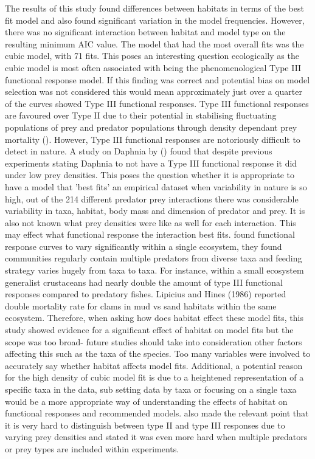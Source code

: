 \documentclass[11pt]{article}
\begin{document}
The results of this study found differences between habitats in terms of the best fit model and also found significant variation in the model frequencies. However, there was no significant interaction between habitat and model type on the resulting minimum AIC value. The model that had the most overall fits was the cubic model, with 71 fits. This poses an interesting question ecologically as the cubic model is most often associated with being the phenomenological Type III functional response model. If this finding was correct and potential bias on model selection was not considered this would mean approximately just over a quarter of the curves showed Type III functional responses. Type III functional responses are favoured over Type II due to their potential in stabilising fluctuating populations of prey and predator populations through density dependant prey mortality (\cite{Sarnelle2008}). However, Type III functional responses are notoriously difficult to detect in nature. A study on Daphnia by (\cite{Sarnelle2008}) found that despite previous experiments stating Daphnia to not have a Type III functional response it did under low prey densities. This poses the question whether it is appropriate to have a model that 'best fits' an empirical dataset when variability in nature is so high, out of the 214 different predator prey interactions there was considerable variability in taxa, habitat, body mass and dimension of predator and prey. It is also not known what prey densities were like as well for each interaction. This may effect what functional response the interaction best fits. \cite{Dunn2020} found functional response curves to vary significantly within a single ecosystem, they found communities regularly contain multiple predators from diverse taxa and feeding strategy varies hugely from taxa to taxa. For instance, within a small ecosystem generalist crustaceans had nearly double the amount of type III functional responses compared to predatory fishes. Lipicius and Hines (1986) reported double mortality rate for clams in mud vs sand habitats within the same ecosystem. Therefore, when asking how does habitat effect these model fits, this study showed evidence for a significant effect of habitat on model fits but the scope was too broad- future studies should take into consideration other factors affecting this such as the taxa of the species. Too many variables were involved to accurately say whether habitat affects model fits. Additional, a potential reason for the high density of cubic model fit is due to a heightened representation of a specific taxa in the data, sub setting data by taxa or focusing on a single taxa would be a more appropriate way of understanding the effects of habitat on functional responses and recommended models. \cite{Dunn2020} also made the relevant point that it is very hard to distinguish between type II and type III responses due to varying prey densities and stated it was even more hard when multiple predators or prey types are included within experiments. 
\end{document}
